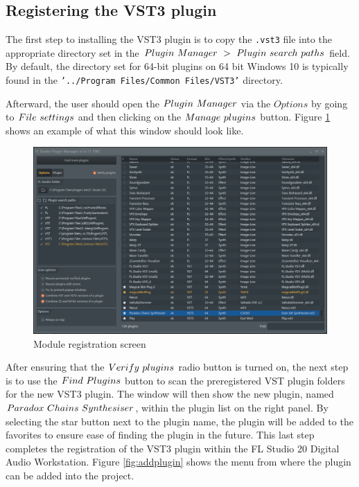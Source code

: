 \documentclass[a4paper,12pt]{report}
\begin{document}
\subsection{Registering the VST3 plugin}
\label{subsec:registeringvsti}
The first step to installing the VST3 plugin is to copy the \texttt{.vst3} file into the appropriate directory set in the $Plugin\ \-Manager\ \->\ \-Plugin\ \-search\ \-paths$ field. By default, the directory set for 64-bit plugins on 64 bit Windows 10 is typically found in the \texttt{'../Program Files/Common Files/VST3'} directory. 

Afterward, the user should open the $Plugin\ \-Manager$ via the $Options$ by going to $File\ \-settings$ and then clicking on the $Manage\ \-plugins$ button. Figure \ref{fig:modulereg} shows an example of what this window should look like.

\begin{figure}[h] \centering
\includegraphics[width=36em]{ModuleRegistration.png}
    \caption{Module registration screen}     \label{fig:modulereg} \end{figure}

After ensuring that the $Verify\ \-plugins$ radio button is turned on, the next step is to use the $Find\ \-Plugins$ button to scan the preregistered VST plugin folders for the new VST3 plugin. The window will then show the new plugin, named $Paradox\ \-Chains\ \-Synthesiser$, within the plugin list on the right panel. By selecting the star button next to the plugin name, the plugin will be added to the favorites to ensure ease of finding the plugin in the future. This last step completes the registration of the VST3 plugin within the FL Studio 20 Digital Audio Workstation. Figure \ref{fig:addplugin} shows the menu from where the plugin can be added into the project.
\end{document}
